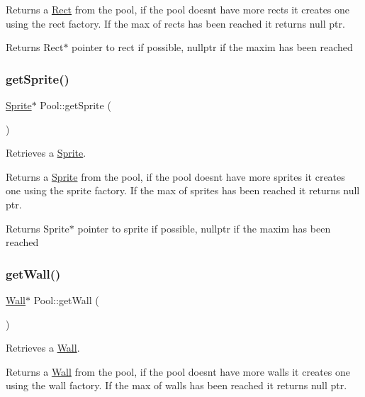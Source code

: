 Returns a \hyperlink{class_rect}{Rect} from the pool, if the pool doesn\textquotesingle{}t have more rects it creates one using the rect factory. If the max of rects has been reached it returns null ptr.

\begin{DoxyReturn}{Returns}
Rect$\ast$ pointer to rect if possible, nullptr if the maxim has been reached 
\end{DoxyReturn}
\mbox{\label{class_pool_abd15708186d45b2e45312c872dd84384}} 
\subsubsection{\texorpdfstring{get\+Sprite()}{getSprite()}}
{\footnotesize\ttfamily \hyperlink{class_sprite}{Sprite}$\ast$ Pool\+::get\+Sprite (\begin{DoxyParamCaption}{ }\end{DoxyParamCaption})}



Retrieves a \hyperlink{class_sprite}{Sprite}. 

Returns a \hyperlink{class_sprite}{Sprite} from the pool, if the pool doesn\textquotesingle{}t have more sprites it creates one using the sprite factory. If the max of sprites has been reached it returns null ptr.

\begin{DoxyReturn}{Returns}
Sprite$\ast$ pointer to sprite if possible, nullptr if the maxim has been reached 
\end{DoxyReturn}
\mbox{\label{class_pool_a0ac76b81263346b168a482c6407ae9e0}} 
\subsubsection{\texorpdfstring{get\+Wall()}{getWall()}}
{\footnotesize\ttfamily \hyperlink{class_wall}{Wall}$\ast$ Pool\+::get\+Wall (\begin{DoxyParamCaption}{ }\end{DoxyParamCaption})}



Retrieves a \hyperlink{class_wall}{Wall}. 

Returns a \hyperlink{class_wall}{Wall} from the pool, if the pool doesn\textquotesingle{}t have more walls it creates one using the wall factory. If the max of walls has been reached it returns null ptr.

